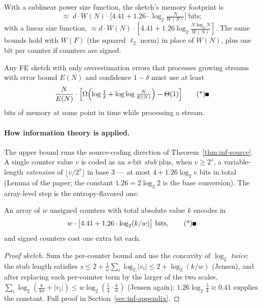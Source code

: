 \begin{theorem}
\label{thm:inf-sublime-space}
With a sublinear power size function, the sketch's memory footprint is
\[
\approx \;d \cdot W(N) \cdot \bigl[4.41 + 1.26\cdot \log_2 \tfrac{N}{W(N)}\bigr]
\ \text{bits};
\]
with a linear size function, $\approx d \cdot W(N) \cdot [4.41 + 1.26\log_2
\frac{N\log_2 N}{W(N)}]$. The same bounds hold with $W(F)$ (the squared $\ell_2$ norm)
in place of $W(N)$, plus one bit per counter if counters are signed. \eop
\end{theorem}

\begin{theorem}\label{thm:inf-sublime-lb}
Any FE sketch with only overestimation errors that processes growing streams with error
bound $E(N)$ and confidence $1-\delta$ must use at least
\[
\frac{N}{E(N)}\cdot\Bigl[\Omega\Bigl(\log\tfrac{1}{\delta} +
\log\log\tfrac{N}{E(N)}\Bigr) - \Theta(1)\Bigr] \eopm
\]
bits of memory at some point in time while processing a stream.
\end{theorem}

\paragraph{How information theory is applied.}
The upper bound runs the source-coding direction of Theorem~\ref{thm:inf-source}. A
single counter value $v$ is coded as an $s$-bit \emph{stub} plus, when $v \ge 2^s$, a
variable-length \emph{extension} of $\lfloor v/2^s \rfloor$ in base $3$ --- at most
$4 + 1.26\log_2 v$ bits in total (Lemma of the paper; the constant $1.26 =
2\log_3 2$ is the base conversion). The array-level step is the entropy-flavored one:

\begin{lemma}
\label{lem:inf-sublime-array}
An array of $w$ unsigned counters with total absolute value $k$ encodes in
\[
w\cdot\bigl[4.41 + 1.26\cdot\log_2 (k/w)\bigr] \ \text{bits}, \eopm
\]
and signed counters cost one extra bit each.
\end{lemma}

\begin{proof}[Proof sketch]
Sum the per-counter bound and use the concavity of $\log_2$ \emph{twice}: the stub
length satisfies $s \le 2 + \frac1w\sum_i \log_2|v_i| \le 2 + \log_2(k/w)$ (Jensen),
and after replacing each per-counter term by the larger of the two scales,
$\sum_i \log_2(\frac{k}{4w} + |v_i|) \le w\log_2(\frac54 \cdot \frac kw)$ (Jensen
again); $1.26\log_2\frac54 \approx 0.41$ supplies the constant. Full proof in
Section~\ref{sec:inf-appendix}.
\end{proof}

